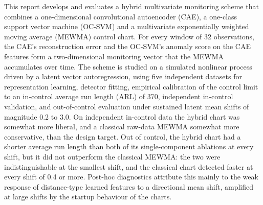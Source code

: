 This report develops and evaluates a hybrid multivariate monitoring scheme that combines a
one-dimensional convolutional autoencoder (CAE), a one-class support vector machine (OC-SVM) and
a multivariate exponentially weighted moving average (MEWMA) control chart. For every window of
32 observations, the CAE's reconstruction error and the OC-SVM's anomaly score on the CAE
features form a two-dimensional monitoring vector that the MEWMA accumulates over time. The
scheme is studied on a simulated nonlinear process driven by a latent vector autoregression,
using five independent datasets for representation learning, detector fitting, empirical
calibration of the control limit to an in-control average run length (ARL) of 370, independent
in-control validation, and out-of-control evaluation under sustained latent mean shifts of
magnitude 0.2 to 3.0. On independent in-control data the hybrid chart was somewhat more liberal,
and a classical raw-data MEWMA somewhat more conservative, than the design target. Out of control,
the hybrid chart had a shorter average run length than both of its single-component ablations at
every shift, but it did not outperform the classical MEWMA: the two were indistinguishable at the smallest
shift, and the classical chart detected faster at every shift of 0.4 or more. Post-hoc
diagnostics attribute this mainly to the weak response of distance-type learned features to a
directional mean shift, amplified at large shifts by the startup behaviour of the charts.
